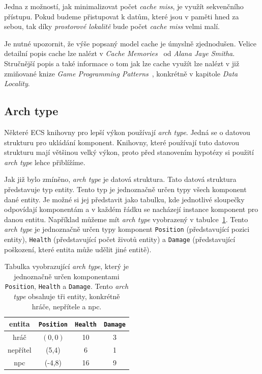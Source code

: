 Jedna z možností, jak minimalizovat počet \textit{cache miss}, je využít sekvenčního přístupu. Pokud budeme přistupovat k datům, které jsou v paměti hned za sebou, tak díky \textit{prostorové lokalitě} bude počet \textit{cache miss} velmi malí.

Je nutné upozornit, že výše popsaný model cache je úmyslně zjednodušen. Velice detailní popis cache lze nalézt v \textit{Cache Memories}~\cite{10.1145/356887.356892} od \textit{Alana Jaye Smitha}. Stručnější popis a také informace o tom jak lze cache využít lze nalézt v již zmiňované knize \textit{Game Programming Patterns}~\cite{nystrom2014game}, konkrétně v kapitole \textit{Data Locality}. 

\subsection{Arch type}
Některé ECS knihovny pro lepší výkon používají \textit{arch type}. Jedná se o datovou strukturu pro ukládání komponent. Knihovny, které používají tuto datovou strukturu mají většinou velký výkon, proto před stanovením hypotézy si použití \textit{arch type} lehce přiblížíme.

Jak již bylo zmíněno, \textit{arch type} je datová struktura. Tato datová struktura představuje typ entity. Tento typ je jednoznačně určen typy všech komponent dané entity. Je možné si jej představit jako tabulku, kde jednotlivé sloupečky odpovídají komponentám a v každém řádku se nacházejí instance komponent pro danou entitu. Například můžeme mít \textit{arch type} vyobrazený v tabulce~\ref{tab:arch-type}. Tento \textit{arch type} je jednoznačně určen typy komponent \texttt{Position} (představující pozici entity), \texttt{Health} (představující počet životů entity) a \texttt{Damage} (představující poškození, které entita může udělit jiné entitě).

\begin{table}[!htb]
    \centering\footnotesize\sf
    \begin{tabular}{c c c c}
        \toprule
        entita & \texttt{Position} & \texttt{Health} & \texttt{Damage} \\
        \midrule
        hráč & $(0,0)$ & 10 & 3 \\
        nepřítel & (5,4) & 6 & 1 \\
        npc & (-4,8) & 16 & 9\\
        \bottomrule
    \end{tabular}
    \caption{Tabulka vyobrazující \textit{arch type}, který je jednoznačně určen komponentami \texttt{Position}, \texttt{Health} a \texttt{Damage}. Tento \textit{arch type} obsahuje tři entity, konkrétně hráče, nepřítele a npc.}
    \label{tab:arch-type}
\end{table}

